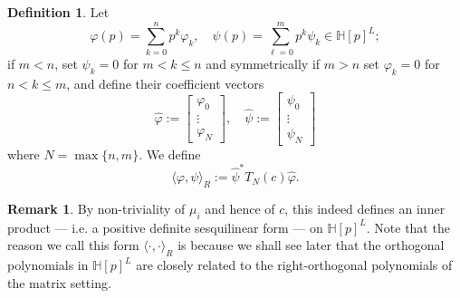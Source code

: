 \documentclass[11pt,reqno]{amsart}
\def\p{\varphi}
\def\q{\psi}
\def\HH{\mathbb{H}}
\theoremstyle{definition}
\newtheorem{definition}[theorem]{Definition}
\newtheorem{remark}[theorem]{Remark}
\numberwithin{equation}{section}
\renewcommand{\hat}{\widehat}
\begin{document}
\begin{definition}
\label{def:R-IP}
	Let
	\[
	    \p(p) = \sum_{k=0}^n p^k \p_k, \quad \q(p) = \sum_{\ell = 0}^m p^k \q_k \in \HH[p]^L;
	\]
	if \(m < n\), set \(\q_k = 0\) for \(m < k \leq n\) and symmetrically if \(m > n\) set \(\p_k = 0\) for \(n < k \leq m\), and define their coefficient vectors
	\[
	    \hat{\p} := \begin{bmatrix} \p_0 \\ \vdots \\ \p_N\end{bmatrix}, \quad \hat{\q} := \begin{bmatrix} \q_0 \\ \vdots \\ \q_N\end{bmatrix}
	\]
	where \(N = \max\{n,m\}\). 
	We define
	\[
	    \langle \p, \q \rangle_R := \hat{\q}^* T_N(c) \hat{\p}.
	\]
\end{definition}

\begin{remark}
	By non-triviality of \(\mu_i\) and hence of \(c\), this indeed defines an inner product --- i.e. a positive definite sesquilinear form --- on \(\HH[p]^L\). Note that the reason we call this form \(\langle\cdot,\cdot\rangle_R\) is because we shall see later that the orthogonal polynomials in \(\HH[p]^L\) are closely related to the right-orthogonal polynomials of the matrix setting.
\end{remark}
\end{document}
